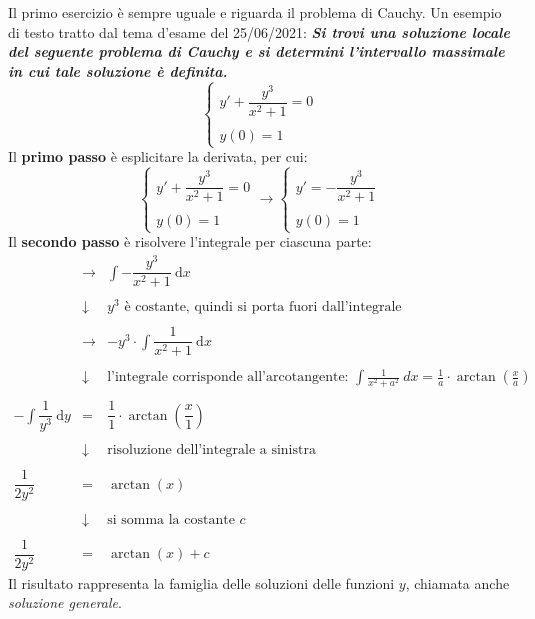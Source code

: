 \documentclass[a4paper]{article}
\begin{document}
	Il primo esercizio è sempre uguale e riguarda il problema di Cauchy. Un esempio di testo tratto dal tema d'esame del 25/06/2021: \textcolor{Green4}{\textbf{\emph{Si trovi una soluzione locale del seguente problema di Cauchy e si determini l'intervallo massimale in cui tale soluzione è definita.}}}
	\begin{equation*}
		\begin{cases}
			y' + \dfrac{y^{3}}{x^{2} + 1} = 0 \\
			\\
			y\left(0\right) = 1
		\end{cases}
	\end{equation*}
	Il \textbf{primo passo} è esplicitare la derivata, per cui:
	\begin{equation*}
		\begin{cases}
			y' + \dfrac{y^{3}}{x^{2} + 1} = 0 \\
			\\
			y\left(0\right) = 1
		\end{cases}
		\longrightarrow
		\begin{cases}
			y' = -\dfrac{y^{3}}{x^{2} + 1} \\
			\\
			y\left(0\right) = 1
		\end{cases}
	\end{equation*}
	Il \textbf{secondo passo} è risolvere l'integrale per ciascuna parte:
	\begin{equation*}
		\begin{array}{rll}
			&\rightarrow& \displaystyle\int-\dfrac{y^{3}}{x^{2} + 1} \: \mathrm{d}x \\
			\\
			&\downarrow& y^{3}\text{ è costante, quindi si porta fuori dall'integrale} \\
			\\
			&\rightarrow& -y^{3} \cdot \displaystyle\int\dfrac{1}{x^{2} + 1} \: \mathrm{d}x \\
			\\
			&\downarrow& \text{l'integrale corrisponde all'arcotangente: } \int\frac{1}{x^{2} + a^{2}} \: dx = \frac{1}{a} \cdot \arctan\left(\frac{x}{a}\right) \\
			\\
			-\displaystyle\int \dfrac{1}{y^{3}} \: \mathrm{d}y &=& \dfrac{1}{1} \cdot \arctan\left(\dfrac{x}{1}\right) \\
			\\
			&\downarrow& \text{risoluzione dell'integrale a sinistra} \\
			\\
			\dfrac{1}{2y^{2}} &=& \arctan\left(x\right) \\
			\\
			&\downarrow& \text{si somma la costante }c\\
			\\
			\dfrac{1}{2y^{2}} &=& \arctan\left(x\right) + c
		\end{array}
	\end{equation*}
	Il risultato rappresenta la famiglia delle soluzioni delle funzioni $y$, chiamata anche \emph{soluzione generale}.\newpage
\end{document}
